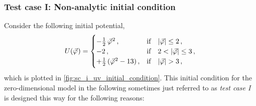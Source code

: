 \subsubsection{Test case I: Non-analytic initial condition}\label{subsubsec:sc1}
Consider the following \uv{} initial potential,
\begin{align}
	U ( \vec{\varphi} \vts ) =
	\begin{cases}
		- \tfrac{1}{2} \, \vec{\varphi}^{\vts 2} \, ,			&	\text{if} \quad |\vec{\varphi}| \leq 2 \, ,\\
		- 2 \, ,									&	\text{if} \quad 2 < |\vec{\varphi}| \leq 3 \, ,\\
		+ \tfrac{1}{2} \, ( \vec{\varphi}^{\vts 2} - 13 ) \, ,	&	\text{if} \quad |\vec{\varphi}|>3 \, ,
	\end{cases}	\label{eq:testing_scenario_non-analytic_quadaratic_asymptote}
\end{align}
which is plotted in \cref{fig:sc_i_uv_initial_condition}.
This initial condition for the zero-dimensional \ON{} model \dash{} in the following sometimes just referred to as \textit{test case I} \dash{} is designed this way for the following reasons:
